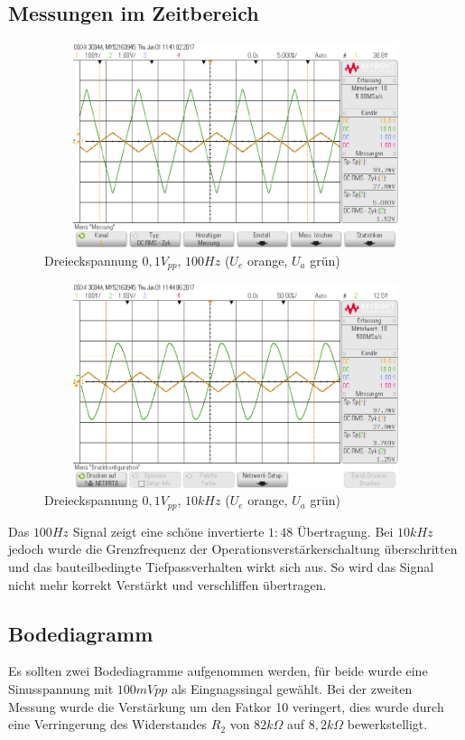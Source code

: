 \subsection{Messungen im Zeitbereich}
\begin{figure}[H]
 \begin{center}
  \includegraphics[height=6cm,width=12cm]{OsziBilder/InvVer_100Hz}
 \end{center}
 \caption{Dreieckspannung $0,1V_{pp}$, $100Hz$ ($U_e$ orange, $U_a$ grün)}
\end{figure}

\begin{figure}[H]
 \begin{center}
  \includegraphics[height=6cm,width=12cm]{OsziBilder/InvVer_10kHz}
 \end{center}
 \caption{Dreieckspannung $0,1V_{pp}$, $10kHz$ ($U_e$ orange, $U_a$ grün)}
\end{figure}
\noindent
Das $100Hz$ Signal zeigt eine schöne invertierte $1:48$ Übertragung. Bei $10kHz$ jedoch
wurde die Grenzfrequenz der Operationsverstärkerschaltung überschritten und das bauteilbedingte
Tiefpassverhalten wirkt sich aus. So wird das Signal nicht mehr korrekt Verstärkt und verschliffen übertragen.\\
\newpage


\subsection{Bodediagramm}
Es sollten zwei Bodediagramme aufgenommen werden, f\"ur beide wurde eine Sinusspannung mit $100mVpp$ als Eingnagssingal gew\"ahlt. Bei der zweiten Messung wurde die Verst\"arkung um den Fatkor 10 veringert, dies wurde durch eine Verringerung des Widerstandes $R_2$ von $82k\Omega$ auf $8,2k\Omega$ bewerkstelligt.

